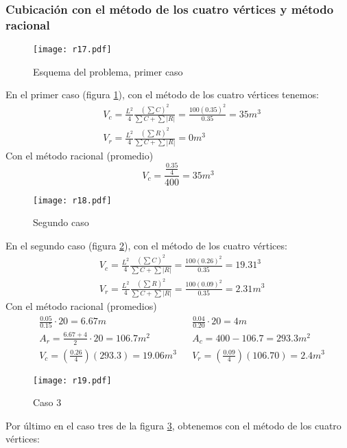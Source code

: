 \subsubsection{Cubicación con el método de los cuatro vértices y método racional}
\begin{figure}[h!]
\centering
  \texttt{[image: r17.pdf]}
  \caption{Esquema del problema, primer caso}
  \label{r17}
\end{figure}
En el primer caso (figura \ref{r17}), con el método de los cuatro vértices tenemos:
\begin{align*}
    &V_c =\frac{L^2}{4}\frac{\left(\sum C\right)^2}{\sum C + \sum\left\lvert R\right\rvert } = \frac{100(0.35)^2}{0.35} =35m^3\\
    &V_r = \frac{L^2}{4} \frac{\left(\sum R\right)^2}{\sum C + \sum\left\lvert R\right\rvert} =0m^3
\end{align*}
Con el método racional (promedio)
\begin{equation*}
    V_c =\frac{\frac{0.35}{4}}{400} =35m^3
\end{equation*}
\begin{figure}[h!]
\centering
  \texttt{[image: r18.pdf]}
  \caption{Segundo caso}
  \label{r18}
\end{figure}
En el segundo caso (figura \ref{r18}), con el método de los cuatro vértices:
\begin{align*}
    &V_c =\frac{L^2}{4}\frac{\left(\sum C\right)^2}{\sum C + \sum\left\lvert R\right\rvert } = \frac{100(0.26)^2}{0.35} =19.31^3\\
    &V_r = \frac{L^2}{4} \frac{\left(\sum R\right)^2}{\sum C + \sum\left\lvert R\right\rvert} = \frac{100(0.09)^2}{0.35} =2.31m^3
\end{align*}
Con el método racional (promedios)
\begin{align*}
        &\frac{0.05}{0.15} \cdot 20 = 6.67m&&\frac{0.04}{0.20} \cdot 20 = 4m \\
        &A_r = \frac{6.67 + 4}{2}\cdot 20 = 106.7m^2&& A_c = 400 - 106.7 = 293.3m^2\\
        &V_c = \left(\frac{0.26}{4}\right)\left(293.3\right) = 19.06m^3&& V_r = \left(\frac{0.09}{4}\right)\left(106.70\right) =2.4m^3
\end{align*}
\begin{figure}[h!]
\centering
  \texttt{[image: r19.pdf]}
  \caption{Caso 3}
  \label{r19}
\end{figure}
Por último en el caso tres de la figura \ref{r19}, obtenemos con el método de los cuatro vértices:
